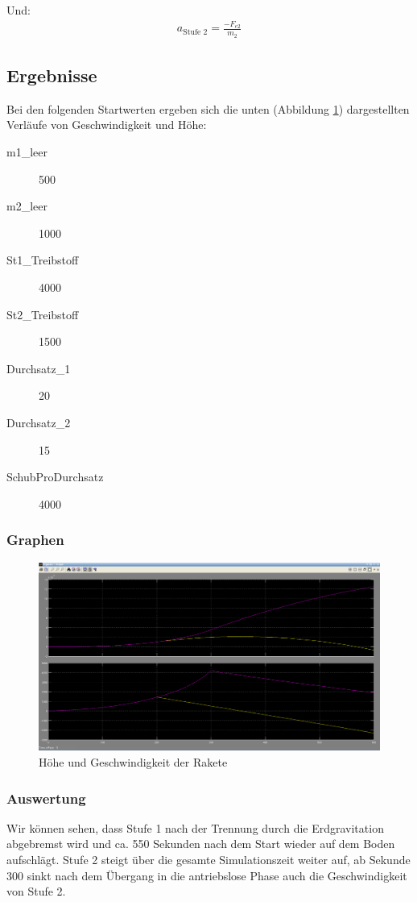 \documentclass[10pt]{scrartcl}
\begin{document}
	Und:
	\begin{align}
	a_{\text{Stufe 2}} = \frac{- F_{e2}}{m_2}
	\end{align}	

	\subsection{Ergebnisse}
	Bei den folgenden Startwerten ergeben sich die unten (Abbildung \ref{pic:rakete}) dargestellten Verläufe von Geschwindigkeit und Höhe:
	\begin{description}
		\item[m1\_leer] 500
		\item[m2\_leer] 1000
		\item[St1\_Treibstoff] 4000
		\item[St2\_Treibstoff] 1500
		\item[Durchsatz\_1] 20
		\item[Durchsatz\_2] 15
		\item[SchubProDurchsatz] 4000
	\end{description}
	
	\subsubsection{Graphen}	
	\begin{figure}[htbp]
		\centering
		\includegraphics[scale=0.25]{ScreenshotRakete.png}
		\caption{Höhe und Geschwindigkeit der Rakete}
		\label{pic:rakete}
	\end{figure}

	\subsubsection{Auswertung}
	Wir können sehen, dass Stufe 1 nach der Trennung durch die Erdgravitation abgebremst wird und ca. 550 Sekunden nach dem Start wieder auf dem Boden aufschlägt. Stufe 2 steigt über die gesamte Simulationszeit weiter auf, ab Sekunde 300 sinkt nach dem Übergang in die antriebslose Phase auch die Geschwindigkeit von Stufe 2.
	
\end{document}
